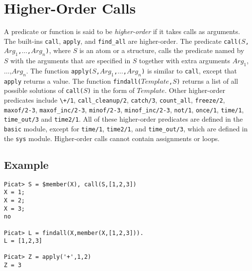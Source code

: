 \section{Higher-Order Calls}
A predicate or function is said to be \emph{higher-order} if it takes calls as arguments. The built-ins \texttt{call}, \texttt{apply}, and \texttt{find\_all} are higher-order. The predicate \texttt{call($S$,$Arg_1$,$\ldots$,$Arg_n$)}, where $S$ is an atom or a structure, calls the predicate named by $S$ with the arguments that are specified in $S$ together with extra arguments $Arg_1$,$\ldots$,$Arg_n$. The function \texttt{apply($S$,$Arg_1$,$\ldots$,$Arg_n$)} is similar to \texttt{call}, except that \texttt{apply} returns a value. The function \texttt{findall($Template$,$S$)} returns a list of all possible solutions of \texttt{call($S$)} in the form of $Template$. Other higher-order predicates include \verb-\+/1-, \texttt{call\_cleanup/2}, \texttt{catch/3}, \texttt{count\_all}, \texttt{freeze/2}, \texttt{maxof/2-3}, \texttt{maxof\_inc/2-3}, \texttt{minof/2-3}, \texttt{minof\_inc/2-3}, \texttt{not/1}, \texttt{once/1},  \texttt{time/1}, \texttt{time\_out/3} and \texttt{time2/1}. All of these higher-order predicates are defined in the {\tt basic} module, except for \texttt{time/1}, \texttt{time2/1}, and \texttt{time\_out/3}, which are defined in the {\tt sys} module. Higher-order calls cannot contain assignments or loops.

\subsection*{Example}
\begin{verbatim}
Picat> S = $member(X), call(S,[1,2,3])
X = 1;
X = 2;
X = 3;
no

Picat> L = findall(X,member(X,[1,2,3])).
L = [1,2,3]

Picat> Z = apply('+',1,2)
Z = 3
\end{verbatim}

